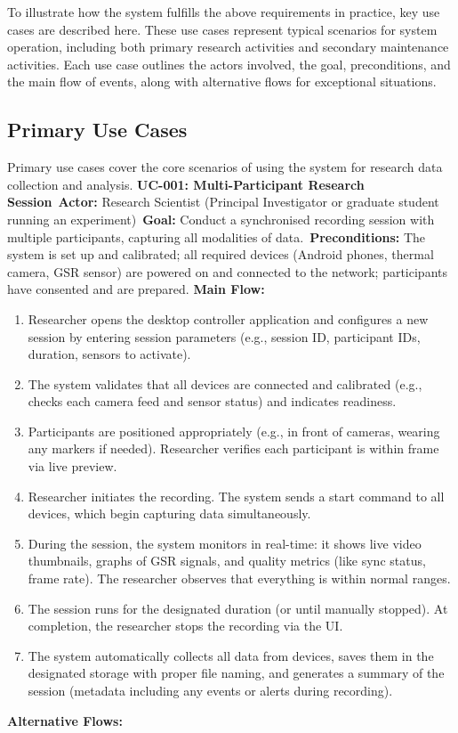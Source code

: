 \documentclass[11pt,a4paper]{report}
\begin{document}
To illustrate how the system fulfills the above requirements in practice, key use cases are described here. These use cases represent typical scenarios for system operation, including both primary research activities and secondary maintenance activities. Each use case outlines the actors involved, the goal, preconditions, and the main flow of events, along with alternative flows for exceptional situations. \subsection{Primary Use Cases}
Primary use cases cover the core scenarios of using the system for research data collection and analysis. \noindent\textbf{UC-001: Multi-Participant Research Session}\
\textbf{Actor:} Research Scientist (Principal Investigator or graduate student running an experiment)\
\textbf{Goal:} Conduct a synchronised recording session with multiple participants, capturing all modalities of data.\
\textbf{Preconditions:} The system is set up and calibrated; all required devices (Android phones, thermal camera, GSR sensor) are powered on and connected to the network; participants have consented and are prepared. \textbf{Main Flow:}
\begin{enumerate}
\item Researcher opens the desktop controller application and configures a new session by entering session parameters (e.g., session ID, participant IDs, duration, sensors to activate).
\item The system validates that all devices are connected and calibrated (e.g., checks each camera feed and sensor status) and indicates readiness.
\item Participants are positioned appropriately (e.g., in front of cameras, wearing any markers if needed). Researcher verifies each participant is within frame via live preview.
\item Researcher initiates the recording. The system sends a start command to all devices, which begin capturing data simultaneously.
\item During the session, the system monitors in real-time: it shows live video thumbnails, graphs of GSR signals, and quality metrics (like sync status, frame rate). The researcher observes that everything is within normal ranges.
\item The session runs for the designated duration (or until manually stopped). At completion, the researcher stops the recording via the UI.
\item The system automatically collects all data from devices, saves them in the designated storage with proper file naming, and generates a summary of the session (metadata including any events or alerts during recording).
\end{enumerate} \textbf{Alternative Flows:}
\end{document}
